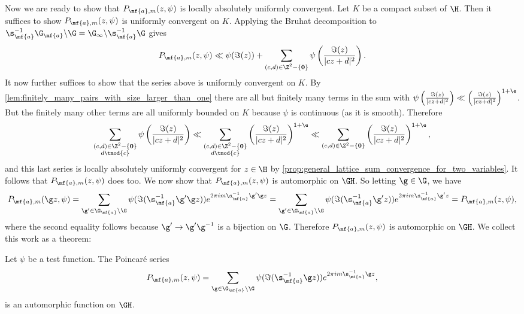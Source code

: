     Now we are ready to show that $P_{\mf{a},m}(z,\psi)$ is locally absolutely uniformly convergent. Let $K$ be a compact subset of $\H$. Then it suffices to show $P_{\mf{a},m}(z,\psi)$ is uniformly convergent on $K$. Applying the Bruhat decomposition to $\s_{\mf{a}}^{-1}\G_{\mf{a}}\backslash\G = \G_{\infty}\backslash\s_{\mf{a}}^{-1}\G$ gives
    \[
      P_{\mf{a},m}(z,\psi) \ll \psi(\Im(z))+\sum_{\substack{(c,d) \in \Z^{2}-\{\mathbf{0}\}}}\psi\left(\frac{\Im(z)}{|cz+d|^{2}}\right).
    \]
    It now further suffices to show that the series above is uniformly convergent on $K$. By \cref{lem:finitely_many_pairs_with_size_larger_than_one} there are all but finitely many terms in the sum with $\psi\left(\frac{\Im(z)}{|cz+d|^{2}}\right) \ll \left(\frac{\Im(z)}{|cz+d|^{2}}\right)^{1+\e}$. But the finitely many other terms are all uniformly bounded on $K$ because $\psi$ is continuous (as it is smooth). Therefore
    \[
      \sum_{\substack{(c,d) \in \Z^{2}-\{\mathbf{0}\} \\ d \tmod{c}}}\psi\left(\frac{\Im(z)}{|cz+d|^{2}}\right) \ll \sum_{\substack{(c,d) \in \Z^{2}-\{\mathbf{0}\} \\ d \tmod{c}}}\left(\frac{\Im(z)}{|cz+d|^{2}}\right)^{1+\e} \ll \sum_{(c,d) \in \Z^{2}-\{\mathbf{0}\}}\left(\frac{\Im(z)}{|cz+d|^{2}}\right)^{1+\e},
    \]
    and this last series is locally absolutely uniformly convergent for $z \in \H$ by \cref{prop:general_lattice_sum_convergence_for_two_variables}. It follows that $P_{\mf{a},m}(z,\psi)$ does too. We now show that $P_{\mf{a},m}(z,\psi)$ is automorphic on $\GH$. So letting $\g \in \G$, we have
    \[
      P_{\mf{a},m}(\g z,\psi) = \sum_{\g' \in \G_{\mf{a}}\backslash\G}\psi(\Im(\s_{\mf{a}}^{-1}\g'\g z))e^{2\pi im\s_{\mf{a}}^{-1}\g'\g z} = \sum_{\g' \in \G_{\mf{a}}\backslash\G}\psi(\Im(\s_{\mf{a}}^{-1}\g' z))e^{2\pi im\s_{\mf{a}}^{-1}\g' z} = P_{\mf{a},m}(z,\psi),
    \]
    where the second equality follows because $\g' \to \g'\g^{-1}$ is a bijection on $\G$. Therefore $P_{\mf{a},m}(z,\psi)$ is automorphic on $\GH$. We collect this work as a theorem:

    \begin{theorem}
      Let $\psi$ be a test function. The Poincar\'e series
      \[
        P_{\mf{a},m}(z,\psi) = \sum_{\g \in \G_{\mf{a}}\backslash\G}\psi(\Im(\s_{\mf{a}}^{-1}\g z))e^{2\pi im\s_{\mf{a}}^{-1}\g z},
      \]
      is an automorphic function on $\GH$.
    \end{theorem}
